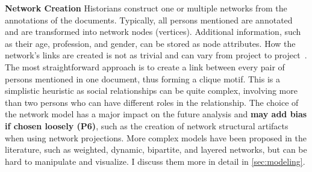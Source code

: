 \noindent\textbf{Network Creation}
Historians construct one or multiple networks from the annotations of the documents.
Typically, all persons mentioned are annotated and are transformed into network nodes (vertices).
Additional information, such as their age, profession, and gender, can be stored as node attributes.
How the network's links are created is not as trivial and can vary from project to project~\cite{alkadi2022}.
The most straightforward approach is to create a link between every pair of persons mentioned in one document, thus forming a clique motif.
This is a simplistic heuristic as social relationships can be quite complex, involving more than two persons who can have different roles in the relationship.
The choice of the network model has a major impact on the future analysis and \textbf{may add bias if chosen loosely (P6)}, such as the creation of network structural artifacts when using network projections\cite{cristofoliAuxSourcesGrands2008}.
More complex models have been proposed in the literature, such as weighted, dynamic, bipartite, and layered networks, but can be hard to manipulate and visualize. I discuss them more in detail in \autoref{sec:modeling}.


